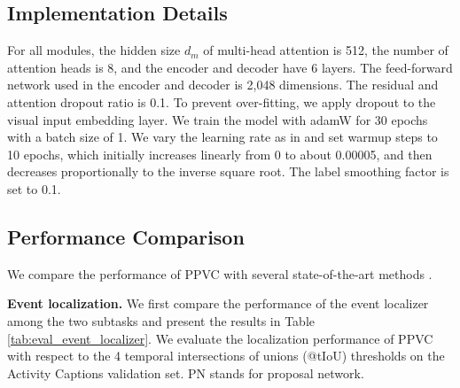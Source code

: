

\subsection{Implementation Details}
\label{subsec:experiments-impl_details}

For all modules, the hidden size $d_m$ of multi-head attention is 512, the number of attention heads is 8, and the encoder and decoder have 6 layers.
The feed-forward network used in the encoder and decoder is 2,048 dimensions.
The residual and attention dropout ratio is 0.1.
To prevent over-fitting, we apply dropout to the visual input embedding layer.
We train the model with adamW \cite{loshchilov2017decoupled} for 30 epochs with a batch size of 1.
We vary the learning rate as in \cite{vaswani2017attention} and set warmup steps to 10 epochs, which initially increases linearly from 0 to about 0.00005, and then decreases proportionally to the inverse square root.
The label smoothing factor is set to 0.1.

\subsection{Performance Comparison}
\label{subsec:experiments-perfom_comp}
We compare the performance of PPVC with several state-of-the-art methods \cite{krishna2017dense,wang2018bidirectional,li2018jointly,zhou2018end,mun2019streamlined,suin2020efficient,wang2020event,chen2021towards,deng2021sketch,wang2021end}.



\textbf{Event localization.}
We first compare the performance of the event localizer among the two subtasks and present the results in Table \ref{tab:eval_event_localizer}.
We evaluate the localization performance of PPVC with respect to the 4 temporal intersections of unions (@tIoU) thresholds on the Activity Captions validation set.
PN stands for proposal network.


